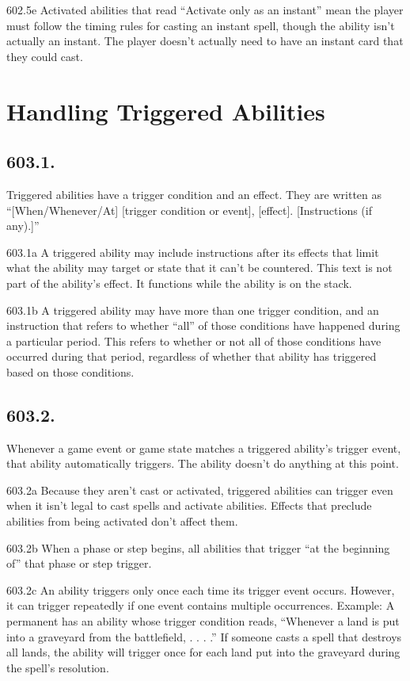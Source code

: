 602.5e Activated abilities that read “Activate only as an instant” mean the player must follow the timing rules for casting an instant spell, though the ability isn’t actually an instant. The player doesn’t actually need to have an instant card that they could cast.

\section{Handling Triggered Abilities}
\subsection*{603.1.}
Triggered abilities have a trigger condition and an effect. They are written as “[When/Whenever/At] [trigger condition or event], [effect]. [Instructions (if any).]”

603.1a A triggered ability may include instructions after its effects that limit what the ability may target or state that it can’t be countered. This text is not part of the ability’s effect. It functions while the ability is on the stack.

603.1b A triggered ability may have more than one trigger condition, and an instruction that refers to whether “all” of those conditions have happened during a particular period. This refers to whether or not all of those conditions have occurred during that period, regardless of whether that ability has triggered based on those conditions.

\subsection*{603.2.}
Whenever a game event or game state matches a triggered ability’s trigger event, that ability automatically triggers. The ability doesn’t do anything at this point.

603.2a Because they aren’t cast or activated, triggered abilities can trigger even when it isn’t legal to cast spells and activate abilities. Effects that preclude abilities from being activated don’t affect them.

603.2b When a phase or step begins, all abilities that trigger “at the beginning of” that phase or step trigger.

603.2c An ability triggers only once each time its trigger event occurs. However, it can trigger repeatedly if one event contains multiple occurrences.
Example: A permanent has an ability whose trigger condition reads, “Whenever a land is put into a graveyard from the battlefield, . . . .” If someone casts a spell that destroys all lands, the ability will trigger once for each land put into the graveyard during the spell’s resolution.

